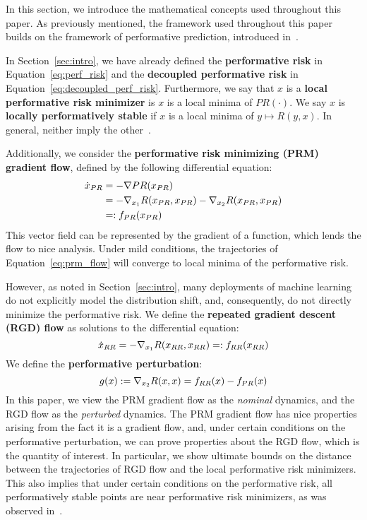 
In this section, we introduce the mathematical concepts used throughout this paper. As previously mentioned, the framework used throughout this paper builds on the framework of performative prediction, introduced in~\citet{Perdomo:2020tz}.

In Section~\ref{sec:intro}, we have already defined the \textbf{performative risk} in Equation~\eqref{eq:perf_risk} and the \textbf{decoupled performative risk} in Equation~\eqref{eq:decoupled_perf_risk}. 
Furthermore, we say that $x$ is a \textbf{local performative risk minimizer} is $x$ is a local minima of $PR(\cdot)$. We say $x$ is \textbf{locally performatively stable} if $x$ is a local minima of $y \mapsto R(y,x)$. In general, neither imply the other~\citep{Perdomo:2020tz}.

Additionally, we consider the \textbf{performative risk minimizing (PRM) gradient flow}, defined by the following differential equation:
\begin{equation}\label{eq:prm_flow}
   \begin{aligned}
\dot x_{PR} &= - \nabla PR(x_{PR}) \\
&= - \nabla_{x_1} R(x_{PR},x_{PR}) - \nabla_{x_2}R(x_{PR},x_{PR})\\
&=: f_{PR}(x_{PR})
\end{aligned} 
\end{equation}
This vector field can be represented by the gradient of a function, which lends the flow to nice analysis. Under mild conditions, the trajectories of Equation~\eqref{eq:prm_flow} will converge to local minima of the performative risk.

However, as noted in Section~\ref{sec:intro}, many deployments of machine learning do not explicitly model the distribution shift, and, consequently, do not directly minimize the performative risk. We define the \textbf{repeated gradient descent (RGD) flow} as solutions to the differential equation:
\begin{equation}
\label{eq:RGD_flow}
\dot x_{RR} = -\nabla_{x_1}R(x_{RR},x_{RR}) =: f_{RR}(x_{RR})
\end{equation}
We define the \textbf{performative perturbation}:
\[
g(x) := \nabla_{x_2}R(x,x) = f_{RR}(x) - f_{PR}(x)
\]
In this paper, we view the PRM gradient flow as the \textit{nominal} dynamics, and the RGD flow as the \textit{perturbed} dynamics. The PRM gradient flow has nice properties arising from the fact it is a gradient flow, and, under certain conditions on the performative perturbation, we can prove properties about the RGD flow, which is the quantity of interest. In particular, we show ultimate bounds on the distance between the trajectories of RGD flow and the local performative risk minimizers. This also implies that under certain conditions on the performative risk, all performatively stable points are near performative risk minimizers, as was observed in~\citet{Perdomo:2020tz}.

